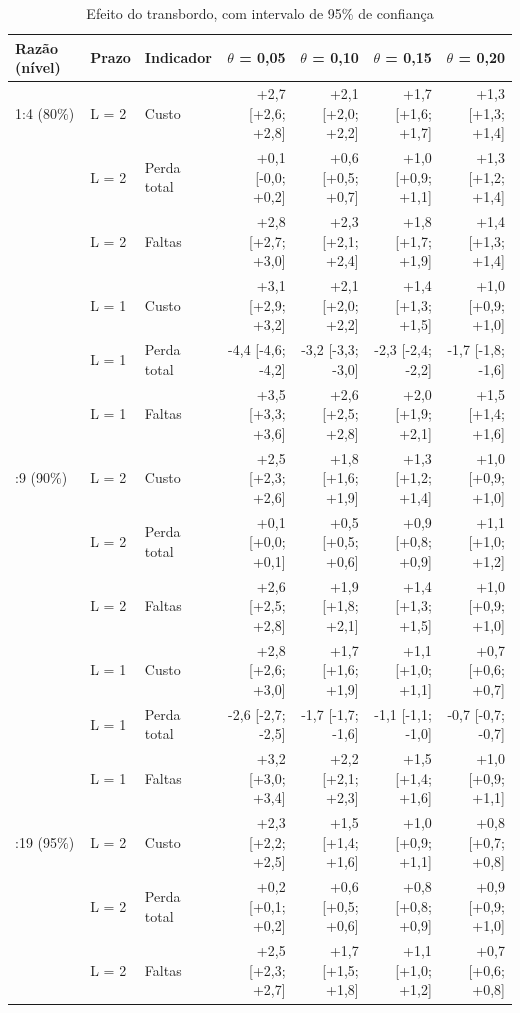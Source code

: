 \begin{table}[htbp]
\centering
\small
\caption{Efeito do transbordo, com intervalo de 95\% de confiança}
\label{tab:tb_diferencas}
\begin{tabular}{lllrrrr}
\toprule
Razão (nível) & Prazo & Indicador & $\theta$ = 0,05 & $\theta$ = 0,10 & $\theta$ = 0,15 & $\theta$ = 0,20 \\
\midrule
1:4 (80\%) & L = 2 & Custo & +2,7 [+2,6; +2,8] & +2,1 [+2,0; +2,2] & +1,7 [+1,6; +1,7] & +1,3 [+1,3; +1,4] \\
 & L = 2 & Perda total & +0,1 [-0,0; +0,2] & +0,6 [+0,5; +0,7] & +1,0 [+0,9; +1,1] & +1,3 [+1,2; +1,4] \\
 & L = 2 & Faltas & +2,8 [+2,7; +3,0] & +2,3 [+2,1; +2,4] & +1,8 [+1,7; +1,9] & +1,4 [+1,3; +1,4] \\
 & L = 1 & Custo & +3,1 [+2,9; +3,2] & +2,1 [+2,0; +2,2] & +1,4 [+1,3; +1,5] & +1,0 [+0,9; +1,0] \\
 & L = 1 & Perda total & -4,4 [-4,6; -4,2] & -3,2 [-3,3; -3,0] & -2,3 [-2,4; -2,2] & -1,7 [-1,8; -1,6] \\
 & L = 1 & Faltas & +3,5 [+3,3; +3,6] & +2,6 [+2,5; +2,8] & +2,0 [+1,9; +2,1] & +1,5 [+1,4; +1,6] \\
\addlinespace
1:9 (90\%) & L = 2 & Custo & +2,5 [+2,3; +2,6] & +1,8 [+1,6; +1,9] & +1,3 [+1,2; +1,4] & +1,0 [+0,9; +1,0] \\
 & L = 2 & Perda total & +0,1 [+0,0; +0,1] & +0,5 [+0,5; +0,6] & +0,9 [+0,8; +0,9] & +1,1 [+1,0; +1,2] \\
 & L = 2 & Faltas & +2,6 [+2,5; +2,8] & +1,9 [+1,8; +2,1] & +1,4 [+1,3; +1,5] & +1,0 [+0,9; +1,0] \\
 & L = 1 & Custo & +2,8 [+2,6; +3,0] & +1,7 [+1,6; +1,9] & +1,1 [+1,0; +1,1] & +0,7 [+0,6; +0,7] \\
 & L = 1 & Perda total & -2,6 [-2,7; -2,5] & -1,7 [-1,7; -1,6] & -1,1 [-1,1; -1,0] & -0,7 [-0,7; -0,7] \\
 & L = 1 & Faltas & +3,2 [+3,0; +3,4] & +2,2 [+2,1; +2,3] & +1,5 [+1,4; +1,6] & +1,0 [+0,9; +1,1] \\
\addlinespace
1:19 (95\%) & L = 2 & Custo & +2,3 [+2,2; +2,5] & +1,5 [+1,4; +1,6] & +1,0 [+0,9; +1,1] & +0,8 [+0,7; +0,8] \\
 & L = 2 & Perda total & +0,2 [+0,1; +0,2] & +0,6 [+0,5; +0,6] & +0,8 [+0,8; +0,9] & +0,9 [+0,9; +1,0] \\
 & L = 2 & Faltas & +2,5 [+2,3; +2,7] & +1,7 [+1,5; +1,8] & +1,1 [+1,0; +1,2] & +0,7 [+0,6; +0,8] \\

\end{tabular}
\end{table}

